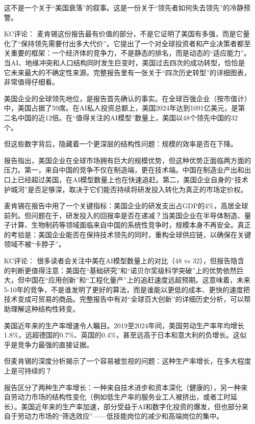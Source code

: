 \documentclass[11pt]{ctexart}
\begin{document}
这不是一个关于“美国衰落”的叙事。这是一份关于“领先者如何失去领先”的冷静预警。

KC评论： 麦肯锡这份报告最有价值的部分，不是它证明了美国有多强，而是它量化了“保持领先需要付出多大代价”。它提出了一个对全球投资者和产业决策者都至关重要的框架：一个经济体的竞争力，不是静态的排名，而是动态的“适应能力”。当AI、地缘冲突和人口结构同时发生巨变时，美国过去四次的成功转型，恰恰是它未来最大的不确定性来源。完整报告里有一张关于“四次历史转型”的详细图表，非常值得仔细看。

美国企业的全球领先地位，是报告首先确认的事实。在全球百强企业（按市值计）中，美国占据了59席。在AI私人投资总额上，美国2024年达到1091亿美元，是第二名中国的近12倍。在“值得关注的AI模型”数量上，美国以48个领先中国的32个。

但这些数字背后，隐藏着一个更深层的结构性问题：规模的效率是否在下降。

报告指出，美国企业在全球市场拥有巨大的规模优势，但这种优势正面临两方面的压力。第一，来自中国的竞争不仅在制造端，更在技术端。中国在制造业产出和出口上已经超过美国，在AI模型数量上也在快速追赶。第二，美国企业自身的“技术护城河”是否足够深，取决于它们能否持续将研发投入转化为真正的市场定价权。

麦肯锡在报告中用了一个关键指标：美国企业的研发支出占GDP的4\%，高居全球前列。但问题在于，研发投入的回报率是否在递减？当美国企业在半导体制造、量子计算、生物制药等领域面临来自中国的系统性竞争时，规模本身不再安全。真正的考验是：美国企业能否在保持技术领先的同时，重构全球供应链，以确保在关键领域不被“卡脖子”。

KC评论： 很多读者会关注中美在AI模型数量上的对比（48 vs 32），但报告隐含的判断更值得注意：美国在“基础研究”和“诺贝尔奖级科学突破”上的优势依然巨大，但中国在“应用创新”和“工程化量产”上的追赶速度远超预期。这意味着，未来5-10年的竞争，不是谁发明了更好的算法，而是谁能以更低的成本、更快的速度把技术变成可贸易的商品。完整报告中有对“全球百大创新”的详细历史分析，可以帮助理解这种结构性转变。

美国近年来的生产率增速令人瞩目。2019至2024年间，美国劳动生产率年均增长1.8\%，远超德国的0.7\%、英国的0.4\%，甚至远高于日本和意大利的负增长。这似乎是竞争力最强的直接证据。

但麦肯锡的深度分析揭示了一个容易被忽视的问题：这种生产率增长，在多大程度上是可持续的？

报告区分了两种生产率增长：一种来自技术进步和资本深化（健康的），另一种来自劳动力市场的结构性变化（例如低生产率的服务业工人被挤出，或者工时延长）。美国近年来的生产率加速，部分受益于AI和数字化投资的爆发，但也部分来自于劳动力市场的“筛选效应”——低技能岗位的减少和高端岗位的集中。
\end{document}

